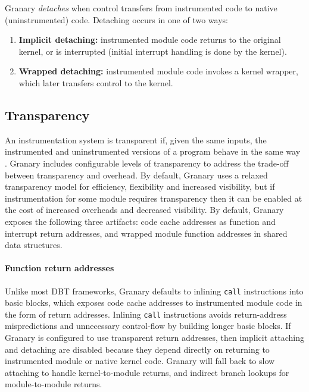 \documentclass[preprint]{sigplanconf}
\begin{document}
Granary \emph{detaches} when control transfers from instrumented code to native (uninstrumented) code. Detaching occurs in one of two ways: \begin{enumerate}
	\item {\bf Implicit detaching:} instrumented module code returns to the original kernel, or is interrupted (initial interrupt handling is done by the kernel).
	\item {\bf Wrapped detaching:} instrumented module code invokes a kernel wrapper, which later transfers control to the kernel.
\end{enumerate}


\subsection{Transparency}\label{sec:transparency}

An instrumentation system is transparent if, given the same inputs, the instrumented and uninstrumented versions of a program behave in the same way \cite{Transparency}. Granary includes configurable levels of transparency to address the trade-off between transparency and overhead. By default, Granary uses a relaxed transparency model for efficiency, flexibility and increased visibility, but if instrumentation for some module requires transparency then it can be enabled at the cost of increased overheads and decreased visibility. By default, Granary exposes the following three artifacts: code cache addresses as function and interrupt return addresses, and wrapped module function addresses in shared data structures.

\vspace{-3pt}\paragraph{Function return addresses}\label{para:return_address_transparency} Unlike most DBT frameworks, Granary defaults to inlining \texttt{call} instructions into basic blocks, which exposes code cache addresses to instrumented module code in the form of return addresses. Inlining \texttt{call} instructions avoids return-address mispredictions and unnecessary control-flow by building longer basic blocks. If Granary is configured to use transparent return addresses, then implicit attaching and detaching are disabled because they depend directly on returning to instrumented module or native kernel code. Granary will fall back to slow attaching to handle kernel-to-module returns, and indirect branch lookups for module-to-module returns.
\end{document}

